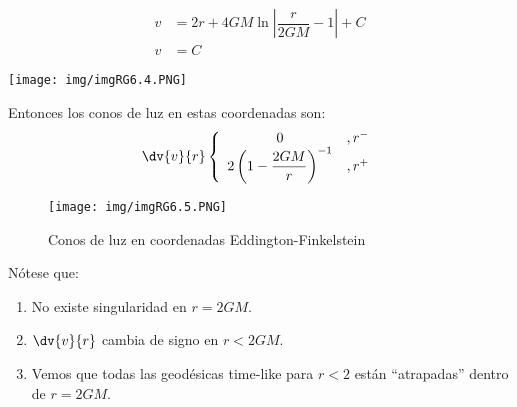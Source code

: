 \documentclass[../main]{subfiles}
\begin{document}
\begin{minipage}{0.5\textwidth}
    \begin{align}
        v&=2r+4GM\ln\left|\dfrac{r}{2GM}-1\right|+C \tag{$r^+$}\\
        v&=C \tag{$r^-$}
    \end{align}
\end{minipage}
\begin{minipage}{0.5\textwidth}
    \begin{center}
        \texttt{[image: img/imgRG6.4.PNG]}
    \end{center}
\end{minipage}

Entonces los conos de luz en estas coordenadas son:
\begin{equation}
    \dv{v}{r}\left\{
    \begin{array}{cc}
        0 & ,r^-\\
        2\left(1-\dfrac{2GM}{r}\right)^{-1} & ,r^+
    \end{array}
    \right.
\end{equation}

\begin{figure}[h]
    \begin{center}
        \texttt{[image: img/imgRG6.5.PNG]}
        \caption{Conos de luz en coordenadas Eddington-Finkelstein}
    \end{center}
\end{figure}

Nótese que:
\begin{enumerate}
    \item No existe singularidad en $r=2GM$.
    \item $\dv{v}{r}$ cambia de signo en $r<2GM$.
    \item Vemos que todas las geodésicas time-like para $r<2$ están ``atrapadas'' dentro de $r=2GM$.
\end{enumerate}
\end{document}
